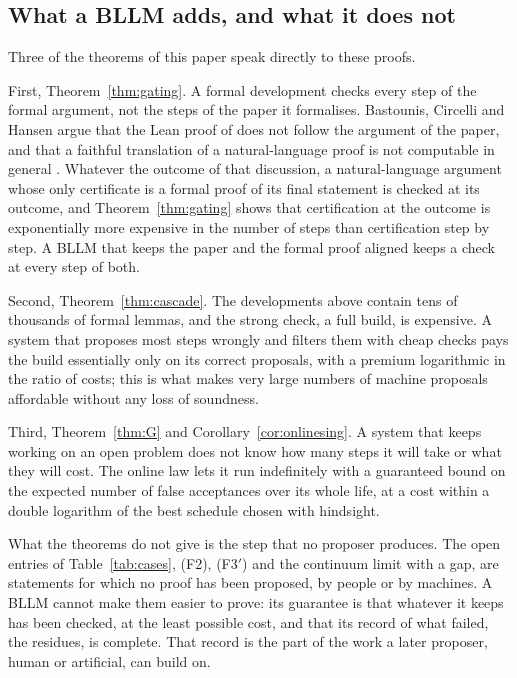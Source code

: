 \subsection{What a BLLM adds, and what it does not}

Three of the theorems of this paper speak directly to these proofs.

First, Theorem~\ref{thm:gating}. A formal development checks every step of the formal argument, not the steps of the paper it formalises. Bastounis, Circelli and Hansen argue that the Lean proof of \cite{OAI26} does not follow the argument of the paper, and that a faithful translation of a natural-language proof is not computable in general \cite{BCH26}. Whatever the outcome of that discussion, a natural-language argument whose only certificate is a formal proof of its final statement is checked at its outcome, and Theorem~\ref{thm:gating} shows that certification at the outcome is exponentially more expensive in the number of steps than certification step by step. A BLLM that keeps the paper and the formal proof aligned keeps a check at every step of both.

Second, Theorem~\ref{thm:cascade}. The developments above contain tens of thousands of formal lemmas, and the strong check, a full build, is expensive. A system that proposes most steps wrongly and filters them with cheap checks pays the build essentially only on its correct proposals, with a premium logarithmic in the ratio of costs; this is what makes very large numbers of machine proposals affordable without any loss of soundness.

Third, Theorem~\ref{thm:G} and Corollary~\ref{cor:onlinesing}. A system that keeps working on an open problem does not know how many steps it will take or what they will cost. The online law lets it run indefinitely with a guaranteed bound on the expected number of false acceptances over its whole life, at a cost within a double logarithm of the best schedule chosen with hindsight.

What the theorems do not give is the step that no proposer produces. The open entries of Table~\ref{tab:cases}, (F2), (F3$'$) and the continuum limit with a gap, are statements for which no proof has been proposed, by people or by machines. A BLLM cannot make them easier to prove: its guarantee is that whatever it keeps has been checked, at the least possible cost, and that its record of what failed, the residues, is complete. That record is the part of the work a later proposer, human or artificial, can build on.


